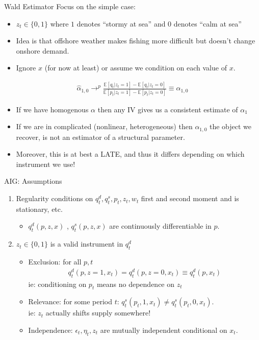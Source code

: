 \documentclass[xcolor=pdftex,dvipsnames,table,mathserif,aspectratio=169]{beamer}
\begin{document}
\begin{frame}{Wald Estimator}
\small
Focus on the simple case:
\begin{itemize}
\item $z_t \in \{0,1\}$ where $1$ denotes ``stormy at sea'' and 0 denotes ``calm at sea''
\item Idea is that offshore weather makes fishing more difficult but doesn't change onshore demand.
\item Ignore $x$ (for now at least) or assume we condition on each value of $x$.
\end{itemize}
\begin{align*}
\hat{\alpha}_{1,0}  \rightarrow^p \frac{\mathbb{E}[q_t | z_t=1] - \mathbb{E}[q_t | z_t=0]}{\mathbb{E}[p_t | z_t=1] - \mathbb{E}[p_t | z_t =0]} \equiv \alpha_{1,0}
\end{align*}
\begin{itemize}
\item If we have homogenous $\alpha$ then any IV gives us a consistent estimate of $\alpha_1$
\item If we are in complicated (nonlinear, heterogeneous) then $\alpha_{1,0}$ the object we recover, is not an estimator of a structural parameter.
\item Moreover, this is at best a LATE, and thus it differs depending on which instrument we use!
\end{itemize}
\end{frame}


\begin{frame}{AIG: Assumptions}
\begin{enumerate}
\item Regularity conditions on $q_t^d, q_t^s,p_t,z_t,w_t$ first and second moment and is stationary, etc.
\begin{itemize}
\item  $q_t^d(p,z,x)$ ,  $q_t^s(p,z,x)$ are continuously differentiable in $p$.
\end{itemize}
\item $z_t \in \{0,1\}$ is a valid instrument in $q_t^d$
\begin{itemize}
\item Exclusion: for all $p,t$ 
\begin{eqnarray*}
q_t^d(p,z=1,x_t) = q_t^d(p,z=0,x_t) \equiv q_t^d(p,x_t)
\end{eqnarray*}
ie: conditioning on $p_t$ means no dependence on $z_t$
\item Relevance: for some period $t$: $q_t^s(p_t,1,x_t) \neq q_t^s(p_t,0,x_t)$.\\
ie: $z_t$ actually shifts supply somewhere!
\item Independence: $\epsilon_t, \eta_t, z_t$ are mutually independent conditional on $x_t$.
\end{itemize}
\end{enumerate}
\end{frame}
\end{document}
